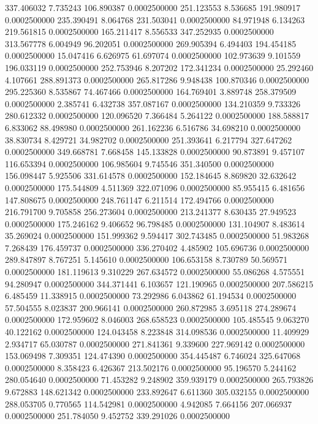 337.406032 7.735243 106.890387 0.0002500000
251.123553 8.536685 191.980917 0.0002500000
235.390491 8.064768 231.503041 0.0002500000
84.971948 6.134263 219.561815 0.0002500000
165.211417 8.556533 347.252935 0.0002500000
313.567778 6.004949 96.202051 0.0002500000
269.905394 6.494403 194.454185 0.0002500000
15.047416 6.626975 61.697074 0.0002500000
102.973639 9.101559 196.033119 0.0002500000
252.753946 8.207202 172.341234 0.0002500000
25.292460 4.107661 288.891373 0.0002500000
265.817286 9.948438 100.870346 0.0002500000
295.225360 8.535867 74.467466 0.0002500000
164.769401 3.889748 258.379509 0.0002500000
2.385741 6.432738 357.087167 0.0002500000
134.210359 9.733326 280.612332 0.0002500000
120.096520 7.366484 5.264122 0.0002500000
188.588817 6.833062 88.498980 0.0002500000
261.162236 6.516786 34.698210 0.0002500000
38.830734 8.429721 34.982702 0.0002500000
251.393641 6.217794 327.647262 0.0002500000
349.668781 7.668458 145.133828 0.0002500000
90.873891 9.457107 116.653394 0.0002500000
106.985604 9.745546 351.340500 0.0002500000
156.098447 5.925506 331.614578 0.0002500000
152.184645 8.869820 32.632642 0.0002500000
175.544809 4.511369 322.071096 0.0002500000
85.955415 6.481656 147.808675 0.0002500000
248.761147 6.211514 172.494766 0.0002500000
216.791700 9.705858 256.273604 0.0002500000
213.241377 8.630435 27.949523 0.0002500000
175.246162 9.406652 96.798485 0.0002500000
131.104907 8.483614 35.269024 0.0002500000
151.999362 9.594417 302.743485 0.0002500000
51.983268 7.268439 176.459737 0.0002500000
336.270402 4.485902 105.696736 0.0002500000
289.847897 8.767251 5.145610 0.0002500000
106.653158 8.730789 50.569571 0.0002500000
181.119613 9.310229 267.634572 0.0002500000
55.086268 4.575551 94.280947 0.0002500000
344.371441 6.103657 121.190965 0.0002500000
207.586215 6.485459 11.338915 0.0002500000
73.292986 6.043862 61.194534 0.0002500000
57.504555 8.023837 200.966141 0.0002500000
260.872985 3.695118 274.289674 0.0002500000
172.959602 8.046003 268.658523 0.0002500000
105.485545 9.063270 40.122162 0.0002500000
124.043458 8.223848 314.098536 0.0002500000
11.409929 2.934717 65.030787 0.0002500000
271.841361 9.339600 227.969142 0.0002500000
153.069498 7.309351 124.474390 0.0002500000
354.445487 6.746024 325.647068 0.0002500000
8.358423 6.426367 213.502176 0.0002500000
95.196570 5.244162 280.054640 0.0002500000
71.453282 9.248902 359.939179 0.0002500000
265.793826 9.672883 148.621342 0.0002500000
233.892647 6.611360 305.032155 0.0002500000
288.053705 0.770565 114.542981 0.0002500000
4.942085 7.664156 207.066937 0.0002500000
251.784050 9.452752 339.291026 0.0002500000
